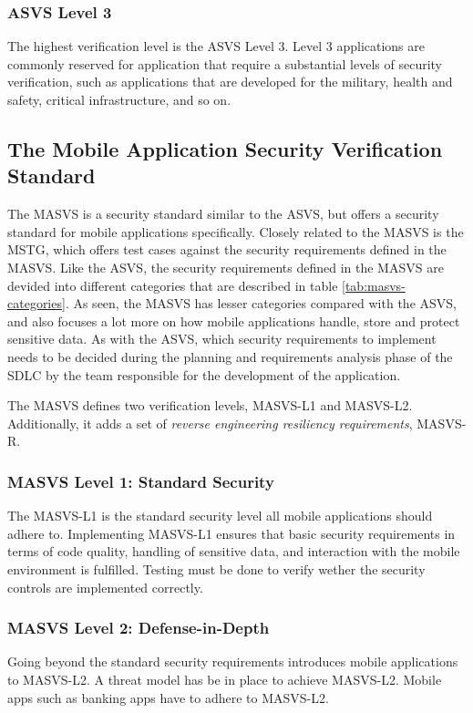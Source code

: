 \subsubsection{ASVS Level 3}
The highest verification level is the ASVS Level 3. Level 3 applications are commonly reserved for application that require a substantial levels of security verification, such as applications that are developed for the military, health and safety, critical infrastructure, and so on.

\subsection{The Mobile Application Security Verification Standard}
The MASVS is a security standard similar to the ASVS, but offers a security standard for mobile applications specifically. Closely related to the MASVS is the MSTG, which offers test cases against the security requirements defined in the MASVS. Like the ASVS, the security requirements defined in the MASVS are devided into different categories that are described in table \ref{tab:masvs-categories}. As seen, the MASVS has lesser categories compared with the ASVS, and also focuses a lot more on how mobile applications handle, store and protect sensitive data. As with the ASVS, which security requirements to implement needs to be decided during the planning and requirements analysis phase of the SDLC by the team responsible for the development of the application.

The MASVS defines two verification levels, MASVS-L1 and MASVS-L2. Additionally, it adds a set of \emph{reverse engineering resiliency requirements}, MASVS-R.

\subsubsection{MASVS Level 1: Standard Security}
The MASVS-L1 is the standard security level all mobile applications should adhere to. Implementing MASVS-L1 ensures that basic security requirements in terms of code quality, handling of sensitive data, and interaction with the mobile environment is fulfilled. Testing must be done to verify wether the security controls are implemented correctly.

\subsubsection{MASVS Level 2: Defense-in-Depth}
Going beyond the standard security requirements introduces mobile applications to MASVS-L2. A threat model has be in place to achieve MASVS-L2. Mobile apps such as banking apps have to adhere to MASVS-L2.


